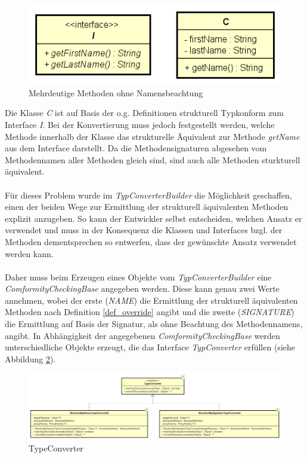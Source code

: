 \documentclass[11pt, 
ngerman,
doublespacing,
chapterinoneline, %
consistentlayout, %
]{scrartcl}
\begin{document}
\begin{figure}[h]
\centering
\includegraphics[scale=0.5]{pics/ambigousMethods.png}
\caption{Mehrdeutige Methoden ohne Namensbeachtung}
\label{ambigousStructMethods}
\end{figure} 
Die Klasse \emph{C} ist auf Basis der o.g. Definitionen strukturell Typkonform zum Interface \emph{I}. Bei der Konvertierung muss jedoch festgestellt werden, welche Methode innerhalb der Klasse das strukturelle Äquivalent zur Methode \emph{getName} aus dem Interface darstellt. Da die Methodensignaturen abgesehen vom Methodennamen aller Methoden gleich sind, sind auch alle Methoden sturkturell äquivalent.\\\\
Für dieses Problem wurde im \emph{TypConverterBuilder} die Möglichkeit geschaffen, einen der beiden Wege zur Ermittlung der strukturell äquivalenten Methoden explizit anzugeben. So kann der Entwickler selbst entscheiden, welchen Ansatz er verwendet und muss in der Konsequenz die Klassen und Interfaces bzgl. der Methoden dementsprechen so entwerfen, dass der gewünschte Ansatz verwendet werden kann.\\\\
Daher muss beim Erzeugen eines Objekte vom \emph{TypConverterBuilder} eine \linebreak\emph{ComformityCheckingBase} angegeben werden. Diese kann genau zwei Werte annehmen, wobei der erste (\emph{NAME}) die Ermittlung der strukturell äquivalenten Methoden nach Definition \ref{def_override} angibt und die zweite (\emph{SIGNATURE}) die Ermittlung auf Basis der Signatur, als ohne Beachtung des Methodennamens, angibt. In Abhängigkeit der angegebenen \emph{ComformityCheckingBase} werden un\-terschiedliche Objekte erzeugt, die das Interface \emph{TypConverter} erfüllen (siehe Abbildung \ref{cd_typeConverter}).
\begin{figure}[h]
\centering
\includegraphics[scale=0.25]{pics/cd_typeConverter.png}
\caption{TypeConverter}
\label{cd_typeConverter}
\end{figure}
\end{document}
